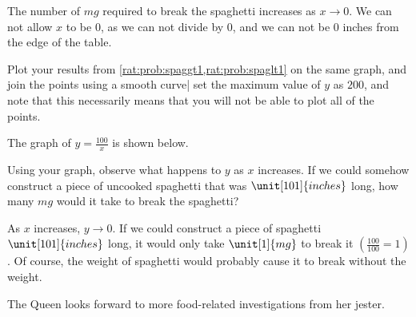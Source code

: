 \begin{problem}
\begin{subproblem}
	\begin{shortsolution}
		The number of $\unit{mg}$ required to break the spaghetti increases as $x\rightarrow 0$.
		We can not allow $x$ to be $0$, as we can not divide by $0$, and we can not
		be $0$ inches from the edge of the table.
	\end{shortsolution}
\end{subproblem}
\begin{subproblem}
	Plot your results from \cref{rat:prob:spaggt1,rat:prob:spaglt1} on the same graph,
	and join the points using a smooth curve| set the maximum value of $y$ as $200$, and
	note that this necessarily means that you will not be able to plot all of the points.
	\begin{shortsolution}
		The graph of $y=\frac{100}{x}$ is shown below.

	\end{shortsolution}
\end{subproblem}
\begin{subproblem}
	Using your graph, observe what happens to $y$ as $x$ increases. If we could somehow
	construct a piece of uncooked spaghetti that was $\unit[101]{inches}$ long, how many
	$\unit{mg}$ would it take to break the spaghetti?
	\begin{shortsolution}
		As $x$ increases, $y\rightarrow 0$. If we could construct a piece of spaghetti
		$\unit[101]{inches}$ long, it would only take $\unit[1]{mg}$ to break it $\left(\frac{100}{100}=1\right)$. Of course,
		the weight of spaghetti would probably cause it to break without the weight.
	\end{shortsolution}
\end{subproblem}
The Queen looks forward to more food-related investigations from her jester.
\end{problem}



